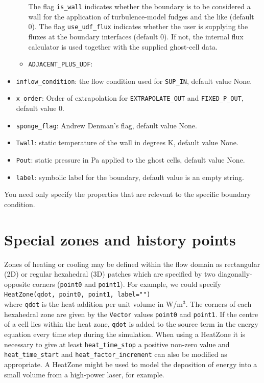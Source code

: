 \documentclass[12pt,a4paper,twoside]{article}
\begin{document}
\begin{itemize}
\begin{itemize}
        The flag \texttt{is\_wall} indicates whether the boundary is to be considered
        a wall for the application of turbulence-model fudges and the like (default 0).
        The flag \texttt{use\_udf\_flux} indicates whether the user is supplying
        the fluxes at the boundary interfaces (default 0).  
        If not, the internal flux calculator is used together with the supplied ghost-cell data.
      \item \texttt{ADJACENT\_PLUS\_UDF}:
    \end{itemize}
  \item \texttt{inflow\_condition}: the flow condition used for
    \texttt{SUP\_IN}, default value None.
  \item \texttt{x\_order}: Order of extrapolation for \texttt{EXTRAPOLATE\_OUT} and 
    \texttt{FIXED\_P\_OUT}, default value 0.
  \item \texttt{sponge\_flag}: Andrew Denman's flag, default value None.
  \item \texttt{Twall}: static temperature of the wall in degrees K, default value None.
  \item \texttt{Pout}: static pressure in Pa applied to the ghost cells, default value None.
  \item \texttt{label}: symbolic label for the boundary, default value is an empty string.
\end{itemize}
You need only specify the properties that are relevant to the specific
boundary condition.

\bigskip
\section{Special zones and history points}
\label{sec:special-zones}
% 
Zones of heating or cooling may be defined within the flow domain as rectangular (2D) 
or regular hexahedral (3D) patches which are specified by two diagonally-opposite
corners (\texttt{point0} and \texttt{point1}).
For example, we could specify\\
\texttt{HeatZone(qdot, point0, point1, label="")}\\
where \texttt{qdot} is the heat addition per unit volume in W/m$^3$.
The corners of each hexahedral zone are given by the \texttt{Vector} values 
\texttt{point0} and \texttt{point1}.
If the centre of a cell lies within the heat zone, \texttt{qdot} is added to
the source term in the energy equation every time step during the simulation. When using
a HeatZone it is necessary to give at least \texttt{heat\_time\_stop} a positive non-zero
value and \texttt{heat\_time\_start} and \texttt{heat\_factor\_increment} can also be modified
as appropriate.
A HeatZone might be used to model the deposition of energy into a small volume from 
a high-power laser, for example.
\end{document}
